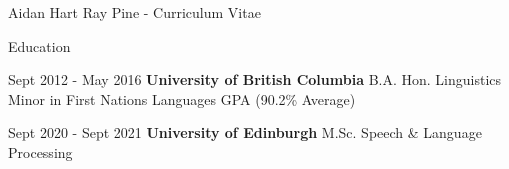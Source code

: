 \documentclass[12pt]{letter}
\date{}
\begin{document}
        \begin{cv}{ Aidan Hart Ray Pine  \space - \space   Curriculum Vitae}
        \vspace{1mm}
      \begin{cvlist}{Education}
                        
                    \item[Sept 2012 - May 2016] \textbf{University of British Columbia}
                \newline B.A. Hon. Linguistics
                \newline Minor in First Nations Languages
                 GPA (90.2\% Average)
        
                        
                    \item[Sept 2020 - Sept 2021] \textbf{University of Edinburgh}
                \newline M.Sc. Speech \& Language Processing
                \newline 
                \newline 
        
                    \end{cvlist}
        

\end{cv}
\end{document}
